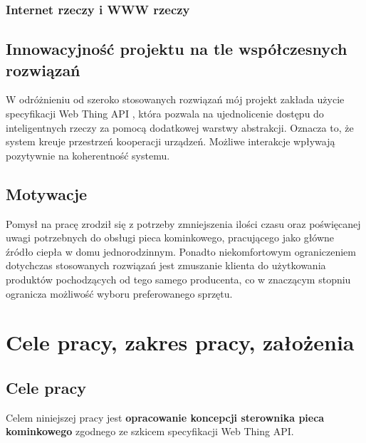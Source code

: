 \documentclass[11pt]{report}
\begin{document}
 \subsection{Internet rzeczy i WWW rzeczy}
 
 
 
 \section{Innowacyjność projektu na tle współczesnych rozwiązań}
 W odróżnieniu od szeroko stosowanych rozwiązań mój projekt zakłada użycie specyfikacji Web Thing API \cite{WebThing2020}, która pozwala na ujednolicenie dostępu do inteligentnych rzeczy za pomocą dodatkowej warstwy abstrakcji. Oznacza to, że system kreuje przestrzeń kooperacji urządzeń. Możliwe interakcje wpływają pozytywnie na koherentność systemu.
 
 \section{Motywacje}
Pomysł na pracę zrodził się z potrzeby zmniejszenia ilości czasu oraz poświęcanej uwagi potrzebnych do obsługi pieca kominkowego, pracującego jako główne źródło ciepła w domu jednorodzinnym. Ponadto niekomfortowym ograniczeniem dotychczas stosowanych rozwiązań jest zmuszanie klienta do użytkowania produktów pochodzących od tego samego producenta, co w znaczącym stopniu ogranicza możliwość wyboru preferowanego sprzętu.

 \chapter{Cele pracy, zakres pracy, założenia}

 \section{Cele pracy}
 Celem niniejszej pracy jest \textbf{opracowanie koncepcji sterownika pieca kominkowego} zgodnego ze szkicem specyfikacji Web Thing API.
 
\end{document}
